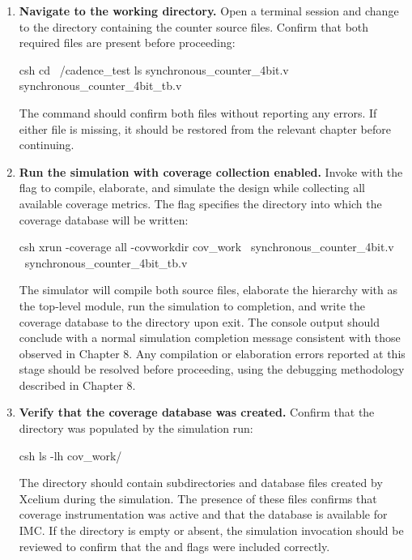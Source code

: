 \begin{enumerate}

\item \textbf{Navigate to the working directory.} Open a terminal session and change to the directory containing the counter source files. Confirm that both required files are present before proceeding:

\begin{codeblock}{csh}
cd ~/cadence_test
ls synchronous_counter_4bit.v synchronous_counter_4bit_tb.v
\end{codeblock}

The  command should confirm both files without reporting any errors. If either file is missing, it should be restored from the relevant chapter before continuing.

\item \textbf{Run the simulation with coverage collection enabled.} Invoke  with the  flag to compile, elaborate, and simulate the design while collecting all available coverage metrics. The  flag specifies the directory into which the coverage database will be written:

\begin{codeblock}{csh}
xrun -coverage all -covworkdir cov_work \
     synchronous_counter_4bit.v \
     synchronous_counter_4bit_tb.v
\end{codeblock}

The simulator will compile both source files, elaborate the hierarchy with  as the top-level module, run the simulation to completion, and write the coverage database to the  directory upon exit. The console output should conclude with a normal simulation completion message consistent with those observed in Chapter 8. Any compilation or elaboration errors reported at this stage should be resolved before proceeding, using the debugging methodology described in Chapter 8.

\item \textbf{Verify that the coverage database was created.} Confirm that the \inlinecode{cov\_work} directory was populated by the simulation run:

\begin{codeblock}{csh}
ls -lh cov_work/
\end{codeblock}

The directory should contain subdirectories and database files created by Xcelium during the simulation. The presence of these files confirms that coverage instrumentation was active and that the database is available for IMC. If the directory is empty or absent, the simulation invocation should be reviewed to confirm that the  and  flags were included correctly.


\end{enumerate}
